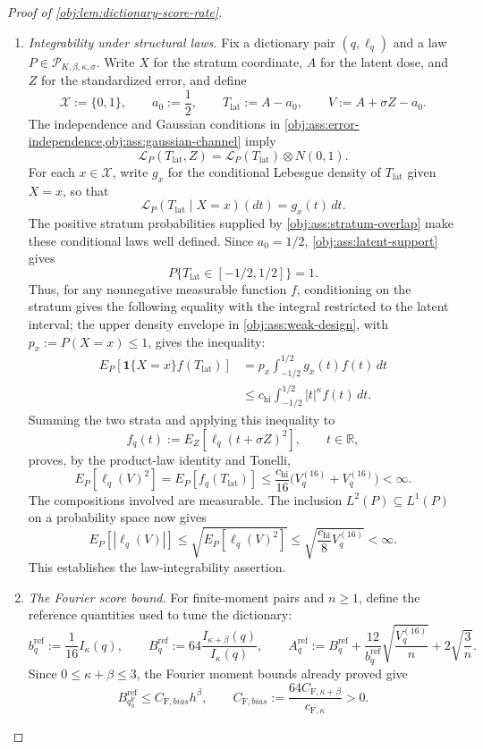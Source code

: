 \begin{proof}[Proof of \cref{obj:lem:dictionary-score-rate}]
\begin{enumerate}
\item \emph{Integrability under structural laws.}
Fix a dictionary pair \((q,\ell_q)\) and a law \(P\in\mathcal P_{K,\beta,\kappa,\sigma}\). Write \(X\) for the stratum coordinate, \(A\) for the latent dose, and \(Z\) for the standardized error, and define
\[
\mathcal X:=\{0,1\},
\qquad
a_0:=\frac12,
\qquad
T_{\mathrm{lat}}:=A-a_0,
\qquad
V:=A+\sigma Z-a_0.
\]
The independence and Gaussian conditions in \cref{obj:ass:error-independence,obj:ass:gaussian-channel} imply
\[
\mathcal L_P(T_{\mathrm{lat}},Z)
=\mathcal L_P(T_{\mathrm{lat}})\otimes N(0,1).
\]
For each \(x\in\mathcal X\), write \(g_x\) for the conditional Lebesgue density of \(T_{\mathrm{lat}}\) given \(X=x\), so that
\[
\mathcal L_P(T_{\mathrm{lat}}\mid X=x)(dt)=g_x(t)\,dt.
\]
The positive stratum probabilities supplied by \cref{obj:ass:stratum-overlap} make these conditional laws well defined. Since \(a_0=1/2\), \cref{obj:ass:latent-support} gives
\[
P\{T_{\mathrm{lat}}\in[-1/2,1/2]\}=1.
\]
Thus, for any nonnegative measurable function \(f\), conditioning on the stratum gives the following equality with the integral restricted to the latent interval; the upper density envelope in \cref{obj:ass:weak-design}, with \(p_x:=P(X=x)\le1\), gives the inequality:
\[
\begin{aligned}
E_P[\mathbf1\{X=x\}f(T_{\mathrm{lat}})]
&=p_x\int_{-1/2}^{1/2}g_x(t)f(t)\,dt\\
&\le c_{\mathrm{hi}}\int_{-1/2}^{1/2}|t|^\kappa f(t)\,dt.
\end{aligned}
\]
Summing the two strata and applying this inequality to
\[
f_q(t):=E_Z[\ell_q(t+\sigma Z)^2],
\qquad t\in\mathbb R,
\]
proves, by the product-law identity and Tonelli,
\[
E_P[\ell_q(V)^2]
=E_P[f_q(T_{\mathrm{lat}})]
\le\frac{c_{\mathrm{hi}}}{16}
\bigl(V_q^{(16)}+V_q^{(16)}\bigr)<\infty.
\]
The compositions involved are measurable. The inclusion \(L^2(P)\subseteq L^1(P)\) on a probability space now gives
\[
E_P[|\ell_q(V)|]
\le\sqrt{E_P[\ell_q(V)^2]}
\le\sqrt{\frac{c_{\mathrm{hi}}}{8}V_q^{(16)}}<\infty.
\]
This establishes the law-integrability assertion.

\item \emph{The Fourier score bound.}
For finite-moment pairs and \(n\ge1\), define the reference quantities used to tune the dictionary:
\[
b_q^{\mathrm{ref}}:=\frac1{16}I_\kappa(q),
\qquad
B_q^{\mathrm{ref}}:=64\frac{I_{\kappa+\beta}(q)}{I_\kappa(q)},
\qquad
A_q^{\mathrm{ref}}:=B_q^{\mathrm{ref}}
+\frac{12}{b_q^{\mathrm{ref}}}\sqrt{\frac{V_q^{(16)}}{n}}
+2\sqrt{\frac3n}.
\]
Since \(0\le\kappa+\beta\le3\), the Fourier moment bounds already proved give
\[
B_{q_h^{\mathrm F}}^{\mathrm{ref}}
\le C_{\mathrm F,bias}h^\beta,
\qquad
C_{\mathrm F,bias}:=
\frac{64C_{\mathrm F,\kappa+\beta}}{c_{\mathrm F,\kappa}}>0.
\]


\end{enumerate}
\end{proof}
